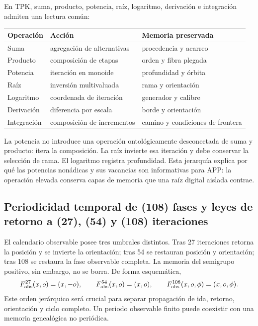 \begin{proposition}
En TPK, suma, producto, potencia, raíz, logaritmo, derivación e integración
admiten una lectura común:
\begin{center}
\begin{tabular}{@{}p{}p{}p{}@{}}
\toprule
Operación & Acción & Memoria preservada \\
\midrule
Suma & agregación de alternativas & procedencia y acarreo \\
Producto & composición de etapas & orden y fibra plegada \\
Potencia & iteración en monoide & profundidad y órbita \\
Raíz & inversión multivaluada & rama y orientación \\
Logaritmo & coordenada de iteración & generador y calibre \\
Derivación & diferencia por escala & borde y orientación \\
Integración & composición de incrementos & camino y condiciones de frontera \\
\bottomrule
\end{tabular}
\end{center}
\end{proposition}

La potencia no introduce una operación ontológicamente desconectada de suma y
producto: itera la composición. La raíz invierte esa iteración y debe conservar
la selección de rama. El logaritmo registra profundidad. Esta jerarquía explica
por qué las potencias nonádicas y sus vacancias son informativas para APP: la
operación elevada conserva capas de memoria que una raíz digital aislada
contrae.

\subsection{Periodicidad temporal de (108) fases y leyes de retorno a (27), (54) y (108) iteraciones}

El calendario observable posee tres umbrales distintos. Tras 27 iteraciones
retorna la posición y se invierte la orientación; tras 54 se restauran posición
y orientación; tras 108 se restaura la fase observable completa. La memoria
del semigrupo positivo, sin embargo, no se borra. De forma esquemática,
\[
F_{\rm obs}^{27}(x,o)=(x,-o),\qquad
F_{\rm obs}^{54}(x,o)=(x,o),\qquad
F_{\rm obs}^{108}(x,o,\phi)=(x,o,\phi).
\]
Este orden jerárquico será crucial para separar propagación de ida, retorno,
orientación y ciclo completo. Un periodo observable finito puede coexistir con
una memoria genealógica no periódica.

